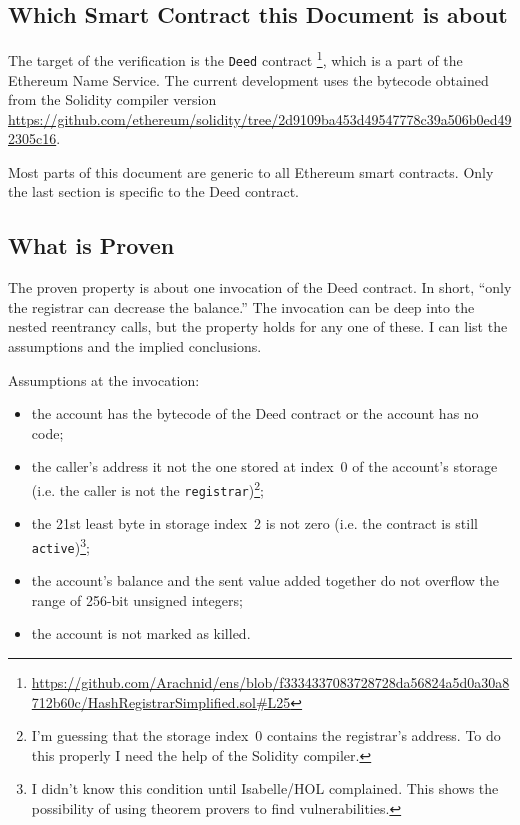 \documentclass[11pt,a4paper]{article}
\begin{document}
\subsection{Which Smart Contract this Document is about}

The target of the verification is the \texttt{Deed} contract%
\footnote{\url{https://github.com/Arachnid/ens/blob/f3334337083728728da56824a5d0a30a8712b60c/HashRegistrarSimplified.sol\#L25}},
which is a part of the Ethereum Name Service.
The current development uses the bytecode obtained from the
Solidity compiler version \url{https://github.com/ethereum/solidity/tree/2d9109ba453d49547778c39a506b0ed492305c16}.

Most parts of this document are generic to all Ethereum smart
contracts.  Only the last section is specific to the Deed contract.

\subsection{What is Proven}

The proven property is about one invocation of the Deed contract.
In short, ``only the registrar can decrease the balance.''
The invocation can be deep into the nested reentrancy calls, but the property holds for any one of these.
I can list the assumptions and the implied conclusions.

Assumptions at the invocation:
\begin{itemize}
  \item the account has the bytecode of the Deed contract or the
    account has no code;
  \item the caller's address it not the one stored at index~0 of the
    account's storage (i.e. the caller is not the \texttt{registrar})\footnote{I'm guessing that the storage index~0 contains the registrar's address.  To do this properly I need the help of the Solidity compiler.};
  \item the 21st least byte in storage index~2 is not zero (i.e. the contract is still \texttt{active})\footnote{I didn't know this condition until Isabelle/HOL complained.  This shows the possibility of using theorem provers to find vulnerabilities.};
  \item the account's balance and the sent value added together do not
    overflow the range of 256-bit unsigned integers;
  \item the account is not marked as killed.
\end{itemize}
\end{document}
